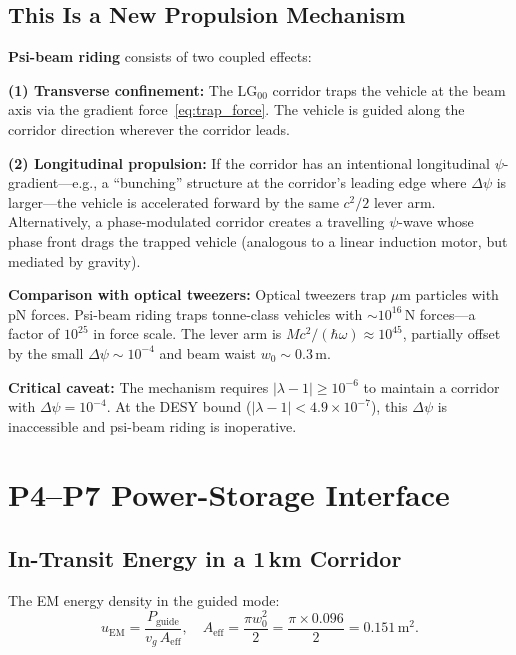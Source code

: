 \documentclass[aps,prd,twocolumn,superscriptaddress]{revtex4-2}
\begin{document}
\subsection{This Is a New Propulsion Mechanism}

\textbf{Psi-beam riding} consists of two coupled effects:

\textbf{(1) Transverse confinement:}  The LG$_{00}$ corridor traps
the vehicle at the beam axis via the gradient force~\eqref{eq:trap_force}.
The vehicle is guided along the corridor direction wherever the corridor
leads.

\textbf{(2) Longitudinal propulsion:}  If the corridor has an intentional
longitudinal $\psi$-gradient---e.g., a ``bunching'' structure at the
corridor's leading edge where $\Delta\psi$ is larger---the vehicle
is accelerated forward by the same $c^2/2$ lever arm.  Alternatively,
a phase-modulated corridor creates a travelling $\psi$-wave whose
phase front drags the trapped vehicle (analogous to a linear
induction motor, but mediated by gravity).

\textbf{Comparison with optical tweezers:}
Optical tweezers trap $\mu$m particles with pN forces.
Psi-beam riding traps tonne-class vehicles with $\sim10^{16}\,\mathrm{N}$
forces---a factor of $10^{25}$ in force scale.  The lever arm is
$Mc^2/(\hbar\omega) \approx 10^{45}$, partially offset by the small
$\Delta\psi \sim 10^{-4}$ and beam waist $w_0 \sim 0.3\,\mathrm{m}$.

\textbf{Critical caveat:}  The mechanism requires $|\lambda-1|\geq10^{-6}$
to maintain a corridor with $\Delta\psi = 10^{-4}$.  At the DESY bound
($|\lambda-1| < 4.9\times10^{-7}$), this $\Delta\psi$ is inaccessible
and psi-beam riding is inoperative.

\section{P4--P7 Power-Storage Interface}
\label{sec:P4_P7}

\subsection{In-Transit Energy in a 1\,km Corridor}

The EM energy density in the guided mode:
\begin{equation}
u_\mathrm{EM} = \frac{P_\mathrm{guide}}{v_g\,A_\mathrm{eff}},
\quad
A_\mathrm{eff} = \frac{\pi w_0^2}{2} = \frac{\pi\times0.096}{2} = 0.151\,\mathrm{m}^2.
\end{equation}
\end{document}
